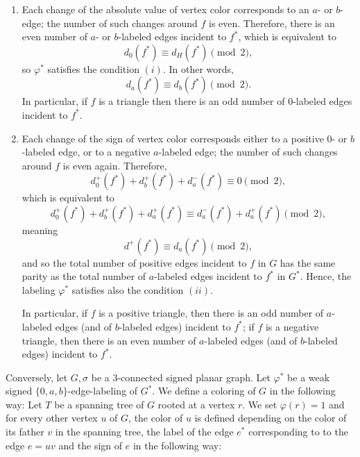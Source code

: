 \documentclass[12pt]{article}
\begin{document}
\begin{enumerate}
\item Each change of the absolute value of vertex color corresponds to an $a$- or $b$-edge; the number of such changes around $f$ is even. Therefore, there is an even number of $a$- or $b$-labeled edges incident to $f^*$, which is equivalent to $$d_0(f^*)\equiv d_{H}(f^*) \pmod{2},$$ so $\varphi^*$ satisfies the condition $(i)$.
In other words, $$d_a(f^*) \equiv d_b(f^*) \pmod{2}.$$ 
    In particular, if $f$ is a triangle then there is an odd number of $0$-labeled edges incident to $f^*$.
\item Each change of the sign of vertex color corresponds either to a positive $0$- or $b$-labeled edge, or to a negative $a$-labeled edge; the number of such changes around $f$ is even again. Therefore,
    $$ d_0^+(f^*)+d_b^+(f^*)+d_a^-(f^*) \equiv 0 \pmod{2},$$
    which is equivalent to
    $$ d_0^+(f^*)+d_b^+(f^*) +d_a^+(f^*) \equiv d_a^-(f^*) + d_a^+(f^*)  \pmod{2},
    $$
    meaning
    $$
    d^+(f^*)\equiv d_a(f^*) \pmod{2},
    $$
        and so the total number of positive edges incident to $f$ in $G$ has the same parity as the total number of $a$-labeled edges incident to $f^*$ in $G^*$.
        Hence, the labeling $\varphi^*$ satisfies also the condition $(ii)$.
        
        In particular, if $f$ is a positive triangle, then there is an odd number of $a$-labeled edges (and of $b$-labeled edges) incident to $f^*$; if $f$ is a negative triangle, then there is an even number of $a$-labeled edges (and of $b$-labeled edges) incident to $f^*$.
\end{enumerate}



Conversely, let $G,\sigma$ be a 3-connected signed planar graph.
Let $\varphi^*$ be a weak signed $\{0,a,b\}$-edge-labeling of $G^*$. We define a coloring of $G$ in the following way: Let $T$ be a spanning tree of $G$ rooted at a vertex $r$. We set $\varphi(r)=1$ and for every other vertex $u$ of $G$, the color of $u$ is defined depending on the color of its father $v$ in the spanning tree, the label of the edge $e^*$ corresponding to to the edge $e=uv$ and the sign of $e$ in the following way:
\end{document}
